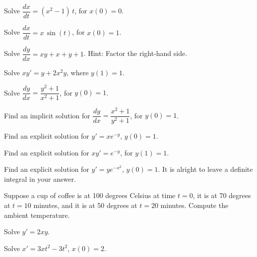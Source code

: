 \begin{exercise}
Solve $\dfrac{dx}{dt} = (x^2-1)\,t$, for $x(0) = 0$.
\end{exercise}

\begin{exercise}
Solve $\dfrac{dx}{dt} = x\,\sin(t)$, for $x(0) = 1$.
\end{exercise}

\begin{exercise}
Solve $\dfrac{dy}{dx} = xy+x+y+1$.  Hint: Factor the right-hand side.
\end{exercise}

\begin{exercise}
Solve $xy' = y + 2x^2 y$, where $y(1) = 1$.
\end{exercise}

\begin{exercise}
Solve $\dfrac{dy}{dx} = \dfrac{y^2+1}{x^2+1}$, for $y(0) = 1$.
\end{exercise}

\begin{exercise}
Find an implicit solution for
$\dfrac{dy}{dx} = \dfrac{x^2+1}{y^2+1}$, for $y(0) = 1$.
\end{exercise}

\begin{exercise}
Find an explicit solution for $y' = xe^{-y}$, $y(0)=1$.
\end{exercise}

\begin{exercise}
Find an explicit solution for $xy' = e^{-y}$, for $y(1)=1$.
\end{exercise}

\begin{exercise}
Find an explicit solution for $y' = ye^{-x^2}$, $y(0)=1$.  It is alright to
leave a definite integral in your answer.
\end{exercise}

\begin{exercise}
Suppose a cup of coffee is at 100 degrees Celsius at time $t=0$,
it is at 70 degrees at $t=10$ minutes, and it is at 50 degrees at $t=20$
minutes.  Compute the ambient temperature.
\end{exercise}

\setcounter{exercise}{100}

\begin{exercise}
Solve $y'=2xy$.
\end{exercise}

\begin{exercise}
Solve $x'=3xt^2-3t^2$, $x(0)=2$.
\end{exercise}

